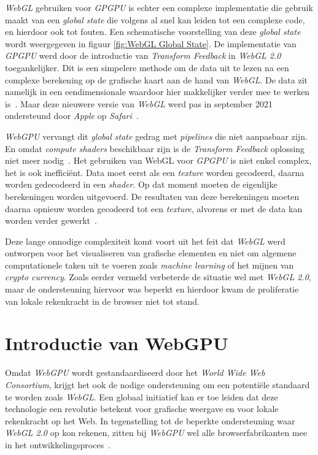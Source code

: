 \textit{WebGL} gebruiken voor \textit{GPGPU} is echter een complexe implementatie die gebruik maakt van een \textit{global state} die volgens \textcite{Surma2022} al snel kan leiden tot een complexe code, en hierdoor ook tot fouten. Een schematische voorstelling van deze \textit{global state} wordt weergegeven in figuur \ref{fig:WebGL Global State}. De implementatie van \textit{GPGPU} werd door de introductie van \textit{Transform Feedback} in \textit{WebGL 2.0} toegankelijker. Dit is een simpelere methode om de data uit te lezen na een complexe berekening op de grafische kaart aan de hand van \textit{WebGL}. De data zit namelijk in een eendimensionale waardoor hier makkelijker verder mee te werken is~\autocite{Tavares2021}. Maar deze nieuwere versie van \textit{WebGL} werd pas in september 2021 ondersteund door \textit{Apple} op \textit{Safari}~\autocite{Surma2022}.

\bigbreak{}

\textit{WebGPU} vervangt dit \textit{global state} gedrag met \textit{pipelines} die niet aanpasbaar zijn. En omdat \textit{compute shaders} beschikbaar zijn is de \textit{Transform Feedback} oplossing niet meer nodig~\autocite{Beaufort2023}. Het gebruiken van WebGL voor \textit{GPGPU} is niet enkel complex, het is ook inefficiënt. Data moet eerst als een \textit{texture} worden gecodeerd, daarna worden gedecodeerd in een \textit{shader}. Op dat moment moeten de eigenlijke berekeningen worden uitgevoerd. De resultaten van deze berekeningen moeten daarna opnieuw worden gecodeerd tot een \textit{texture}, alvorens er met de data kan worden verder gewerkt~\autocite{Surma2022}.

\bigbreak{}

Deze lange onnodige complexiteit komt voort uit het feit dat \textit{WebGL} werd ontworpen voor het visualiseren van grafische elementen en niet om algemene computationele taken uit te voeren zoals \textit{machine learning} of het mijnen van \textit{crypto currency}. Zoals eerder vermeld verbeterde de situatie wel met \textit{WebGL 2.0}, maar de ondersteuning hiervoor was beperkt en hierdoor kwam de proliferatie van lokale rekenkracht in de browser niet tot stand.

\break{}

\section{Introductie van WebGPU}
\label{sec:IntroWebGPU}

Omdat \textit{WebGPU} wordt gestandaardiseerd door het \textit{World Wide Web Consortium}, krijgt het ook de nodige ondersteuning om een potentiële standaard te worden zoals \textit{WebGL}. Een globaal initiatief kan er toe leiden dat deze technologie een revolutie betekent voor grafische weergave en voor lokale rekenkracht op het Web. In tegenstelling tot de beperkte ondersteuning waar \textit{WebGL 2.0} op kon rekenen, zitten bij \textit{WebGPU} wel alle browserfabrikanten mee in het ontwikkelingsproces~\autocite{Surma2022}.

